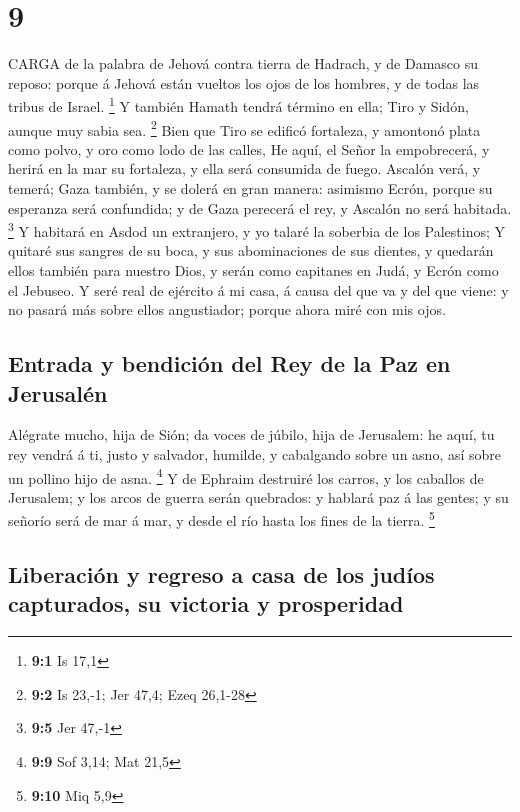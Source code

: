 \hypertarget{section-8}{%
\section{9}\label{section-8}}

 CARGA de la palabra de Jehová contra tierra de Hadrach, y
de Damasco su reposo: porque á Jehová están vueltos los ojos de los
hombres, y de todas las tribus de Israel. \footnote{\textbf{9:1} Is 17,1}
 Y también Hamath tendrá término en ella; Tiro y Sidón,
aunque muy sabia sea. \footnote{\textbf{9:2} Is 23,-1; Jer 47,4; Ezeq
  26,1-28}  Bien que Tiro se edificó fortaleza, y amontonó
plata como polvo, y oro como lodo de las calles,  He aquí,
el Señor la empobrecerá, y herirá en la mar su fortaleza, y ella será
consumida de fuego.  Ascalón verá, y temerá; Gaza también, y
se dolerá en gran manera: asimismo Ecrón, porque su esperanza será
confundida; y de Gaza perecerá el rey, y Ascalón no será habitada.
\footnote{\textbf{9:5} Jer 47,-1}  Y habitará en Asdod un
extranjero, y yo talaré la soberbia de los Palestinos;  Y
quitaré sus sangres de su boca, y sus abominaciones de sus dientes, y
quedarán ellos también para nuestro Dios, y serán como capitanes en
Judá, y Ecrón como el Jebuseo.  Y seré real de ejército á mi
casa, á causa del que va y del que viene: y no pasará más sobre ellos
angustiador; porque ahora miré con mis ojos.

\hypertarget{entrada-y-bendiciuxf3n-del-rey-de-la-paz-en-jerusaluxe9n}{%
\subsection{Entrada y bendición del Rey de la Paz en
Jerusalén}\label{entrada-y-bendiciuxf3n-del-rey-de-la-paz-en-jerusaluxe9n}}

 Alégrate mucho, hija de Sión; da voces de júbilo, hija de
Jerusalem: he aquí, tu rey vendrá á ti, justo y salvador, humilde, y
cabalgando sobre un asno, así sobre un pollino hijo de asna. \footnote{\textbf{9:9}
  Sof 3,14; Mat 21,5}  Y de Ephraim destruiré los carros, y
los caballos de Jerusalem; y los arcos de guerra serán quebrados: y
hablará paz á las gentes; y su señorío será de mar á mar, y desde el río
hasta los fines de la tierra. \footnote{\textbf{9:10} Miq 5,9}

\hypertarget{liberaciuxf3n-y-regreso-a-casa-de-los-juduxedos-capturados-su-victoria-y-prosperidad}{%
\subsection{Liberación y regreso a casa de los judíos capturados, su
victoria y
prosperidad}\label{liberaciuxf3n-y-regreso-a-casa-de-los-juduxedos-capturados-su-victoria-y-prosperidad}}

